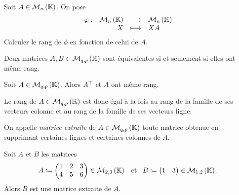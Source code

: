 \documentclass{magnolia}
\begin{document}
\begin{exoUnique}
\exo Soit $A\in\mathcal{M}_{n}\left(\mathbb{K}\right)$. On pose
  \[\begin{array}[t]{lrcl} \displaystyle{\varphi} : & \displaystyle{\mathcal{M}_{n}\left(\ensuremath{\mathbb{K}}\right)} & \longrightarrow & \displaystyle{\mathcal{M}_{n}\left(\ensuremath{\mathbb{K}}\right)} \\ & \displaystyle{X} & \longmapsto & \displaystyle{XA} \end{array}\]
  Calculer le rang de $\phi$ en fonction de celui de $A$.
\end{exoUnique}

\begin{proposition}[utile=3]
Deux matrices $A,B\in\mathcal{M}_{q,p}\left(\mathbb{K}\right)$ sont équivalentes si et seulement si elles
ont même rang.
\end{proposition}

\begin{proposition}[utile=2]
Soit $A\in\mathcal{M}_{q,p}\left(\mathbb{K}\right)$. Alors ${A}^{\top}$ et $A$ ont même rang.
\end{proposition}

\begin{remarqueUnique}
\remarque 
Le rang de $A\in\mathcal{M}_{q,p}\left(\mathbb{K}\right)$ est donc égal à la fois au rang de la famille de ses
  vecteurs colonne et au rang de la famille de ses vecteurs ligne.
\end{remarqueUnique}



\begin{definition}[utile=-3]
  On appelle \emph{matrice extraite} de $A\in\mathcal{M}_{q,p}\left(\mathbb{K}\right)$ toute matrice obtenue en \og supprimant \fg certaines lignes et certaines colonnes de $A$.
  \end{definition}


\begin{exempleUnique}
\exemple Soit $A$ et $B$ les matrices
  \[A\coloneqq
    \begin{pmatrix}
    1 & 2 & 3\\
    4 & 5 & 6
    \end{pmatrix}\in\mathcal{M}_{2,3}\left(\mathbb{K}\right) \quad\!\text{et}\quad\!
    B\coloneqq
    \begin{pmatrix}
    1 & 3
    \end{pmatrix}\in\mathcal{M}_{1,2}\left(\mathbb{K}\right).\]
  Alors $B$ est une matrice extraite de $A$.
\end{exempleUnique}
\end{document}
